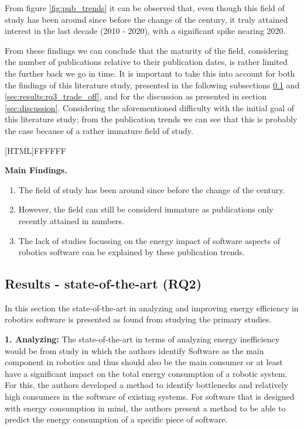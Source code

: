 From figure \ref{fig:pub_trends} it can be observed that, even though this field of study has been around since before the change of the century,
it truly attained interest in the last decade (2010 - 2020), with a significant spike nearing 2020.

From these findings we can conclude that the maturity of the field, considering the number of publications relative to their publication dates, 
is rather limited the further back we go in time. It is important to take this into account for both the findings of this literature study, presented in the following subsections 
\ref{sec:results:rq2_state_of_the_art} and \ref{sec:results:rq3_trade_off}, and for the discussion as presented in section \ref{sec:discussion}.
Considering the aforementioned difficulty with the initial goal of this literature study; from the publication trends we can see that this 
is probably the case because of a rather immature field of study.

\vspace{5mm}

\noindent{}[HTML]{FFFFFF}{\parbox{0.47\textwidth}{%
\noindent \textbf{Main Findings.}
\begin{enumerate}[nolistsep]
\item The field of study has been around since before the change of the century.
\item However, the field can still be considerd immature as publications only recently attained in numbers.
\item The lack of studies focussing on the energy impact of software aspects of robotics software can be explained by these publication trends.
\end{enumerate}}}

\subsection{Results - state-of-the-art (RQ2)}
\label{sec:results:rq2_state_of_the_art}
In this section the state-of-the-art in analyzing and improving energy efficiency in robotics software is presented as found from studying the primary studies.

\noindent\textbf{1. Analyzing:}
The state-of-the-art in terms of analyzing energy inefficiency would be from study \cite{hou2017novel_cloud_evaluation_model} in which the authors
identify Software as the main component in robotics and thus should also be the main consumer or at least have a significant impact on the
total energy consumption of a robotic system.
For this, the authors developed a method to identify bottlenecks and relatively high consumers in the software of existing systems.
For software that is designed with energy consumption in mind, the authors present a method to be able to predict the energy consumption
of a specific piece of software.

